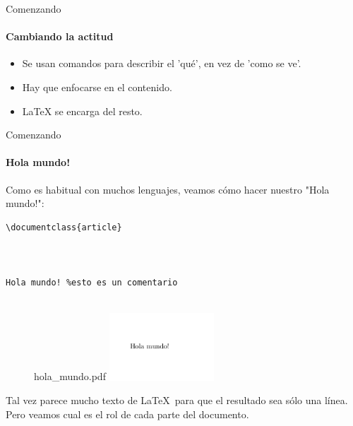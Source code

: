 
\begin{frame}[fragile]{Comenzando}
    \framesubtitle{Cambiando la actitud}
    \begin{itemize}
        \item Se usan comandos para describir el 'qué', en vez de 'como se ve'.
        \item Hay que enfocarse en el contenido.
        \item \LaTeX{} se encarga del resto.
        
    \end{itemize}

    
\end{frame}


\begin{frame}[fragile]{Comenzando}
\framesubtitle{Hola mundo!}

Como es habitual con muchos lenguajes, veamos cómo hacer nuestro "Hola mundo!":

\begin{multicols}{2}
\begin{lstlisting}[title={hola\_mundo.tex}]
\documentclass{article}



Hola mundo! %esto es un comentario


\end{lstlisting}

\begin{figure}
hola\_mundo.pdf
\includegraphics[width=0.35\textwidth]{../images/ejemplo_hola_mundo.png}
\end{figure}

\end{multicols}
\pause
Tal vez parece mucho texto de \LaTeX\ para que el resultado sea sólo una línea. Pero veamos cual es el rol de cada parte del documento.

\end{frame}

